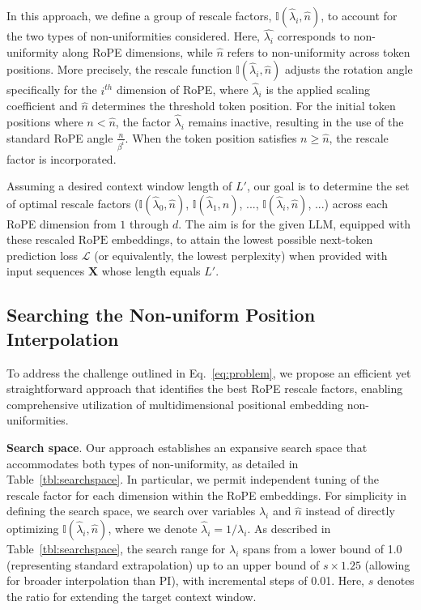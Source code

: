 In this approach, we define a group of rescale factors, $\mathbb{I}(\hat{\lambda}_{i},\hat{n})$, to account for the two types of non-uniformities considered. Here, $\hat{\lambda_i}$ corresponds to non-uniformity along RoPE dimensions, while $\hat{n}$ refers to non-uniformity across token positions. More precisely, the rescale function $\mathbb{I}(\hat{\lambda}_{i},\hat{n})$ adjusts the rotation angle specifically for the $i^{th}$ dimension of RoPE, where $\hat\lambda_{i}$ is the applied scaling coefficient and $\hat{n}$ determines the threshold token position. For the initial token positions where $n < \hat{n}$, the factor $\hat\lambda_{i}$ remains inactive, resulting in the use of the standard RoPE angle $\frac{n}{\beta^i}$. When the token position satisfies $n \geq \hat{n}$, the rescale factor is incorporated.

Assuming a desired context window length of $L'$, our goal is to determine the set of optimal rescale factors ($\mathbb{I}(\hat{\lambda}_{0},\hat{n})$, $\mathbb{I}(\hat{\lambda}_{1},\hat{n})$, ..., $\mathbb{I}(\hat{\lambda}_{i},\hat{n})$, ...) across each RoPE dimension from $1$ through $d$. The aim is for the given $\text{LLM}$, equipped with these rescaled $\text{RoPE}$ embeddings, to attain the lowest possible next-token prediction loss $\mathcal{L}$ (or equivalently, the lowest perplexity) when provided with input sequences $\mathbf{X}$ whose length equals $L'$.

\subsection{Searching the Non-uniform Position Interpolation}

To address the challenge outlined in Eq.~\ref{eq:problem}, we propose an efficient yet straightforward approach that identifies the best RoPE rescale factors, enabling comprehensive utilization of multidimensional positional embedding non-uniformities.

\textbf{Search space}. Our approach establishes an expansive search space that accommodates both types of non-uniformity, as detailed in Table~\ref{tbl:searchspace}. In particular, we permit independent tuning of the rescale factor for each dimension within the RoPE embeddings. For simplicity in defining the search space, we search over variables $\lambda_i$ and $\hat{n}$ instead of directly optimizing $\mathbb{I}(\hat{\lambda}_{i},\hat{n})$, where we denote $\hat{\lambda}_{i}=1/\lambda_i$. As described in Table~\ref{tbl:searchspace}, the search range for $\lambda_i$ spans from a lower bound of 1.0 (representing standard extrapolation) up to an upper bound of $s\times1.25$ (allowing for broader interpolation than PI), with incremental steps of 0.01. Here, $s$ denotes the ratio for extending the target context window.

